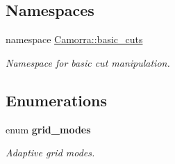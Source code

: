 \subsection*{Namespaces}
\begin{DoxyCompactItemize}
\item 
namespace \hyperlink{a00801}{Camorra::basic\_\-cuts}


\begin{DoxyCompactList}\small\item\em Namespace for basic cut manipulation. \end{DoxyCompactList}

\end{DoxyCompactItemize}
\subsection*{Enumerations}
\begin{DoxyCompactItemize}
\item 
enum {\bfseries grid\_\-modes} 
\begin{DoxyCompactList}\small\item\em Adaptive grid modes. \end{DoxyCompactList}\end{DoxyCompactItemize}

